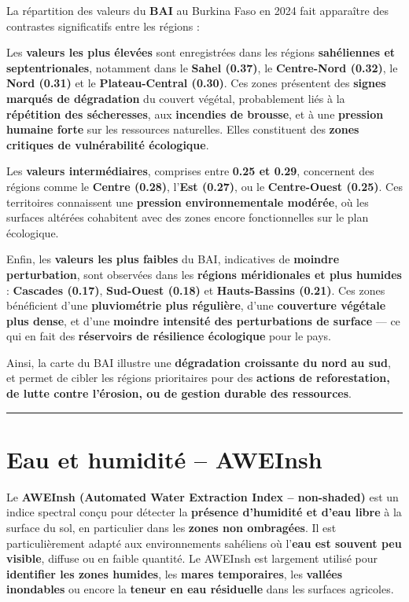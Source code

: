 \documentclass[
]{book}
\begin{document}
La répartition des valeurs du \textbf{BAI} au Burkina Faso en 2024 fait apparaître des contrastes significatifs entre les régions :

Les \textbf{valeurs les plus élevées} sont enregistrées dans les régions \textbf{sahéliennes et septentrionales}, notamment dans le \textbf{Sahel (0.37)}, le \textbf{Centre-Nord (0.32)}, le \textbf{Nord (0.31)} et le \textbf{Plateau-Central (0.30)}. Ces zones présentent des \textbf{signes marqués de dégradation} du couvert végétal, probablement liés à la \textbf{répétition des sécheresses}, aux \textbf{incendies de brousse}, et à une \textbf{pression humaine forte} sur les ressources naturelles. Elles constituent des \textbf{zones critiques de vulnérabilité écologique}.

Les \textbf{valeurs intermédiaires}, comprises entre \textbf{0.25 et 0.29}, concernent des régions comme le \textbf{Centre (0.28)}, l'\textbf{Est (0.27)}, ou le \textbf{Centre-Ouest (0.25)}. Ces territoires connaissent une \textbf{pression environnementale modérée}, où les surfaces altérées cohabitent avec des zones encore fonctionnelles sur le plan écologique.

Enfin, les \textbf{valeurs les plus faibles} du BAI, indicatives de \textbf{moindre perturbation}, sont observées dans les \textbf{régions méridionales et plus humides} : \textbf{Cascades (0.17)}, \textbf{Sud-Ouest (0.18)} et \textbf{Hauts-Bassins (0.21)}. Ces zones bénéficient d'une \textbf{pluviométrie plus régulière}, d'une \textbf{couverture végétale plus dense}, et d'une \textbf{moindre intensité des perturbations de surface} --- ce qui en fait des \textbf{réservoirs de résilience écologique} pour le pays.

Ainsi, la carte du BAI illustre une \textbf{dégradation croissante du nord au sud}, et permet de cibler les régions prioritaires pour des \textbf{actions de reforestation, de lutte contre l'érosion, ou de gestion durable des ressources}.

\begin{center}\rule{0.5\linewidth}{0.5pt}\end{center}

\section{Eau et humidité -- AWEInsh}\label{eau-et-humidituxe9-aweinsh}

Le \textbf{AWEInsh (Automated Water Extraction Index -- non-shaded)} est un indice spectral conçu pour détecter la \textbf{présence d'humidité et d'eau libre} à la surface du sol, en particulier dans les \textbf{zones non ombragées}. Il est particulièrement adapté aux environnements sahéliens où l'\textbf{eau est souvent peu visible}, diffuse ou en faible quantité. Le AWEInsh est largement utilisé pour \textbf{identifier les zones humides}, les \textbf{mares temporaires}, les \textbf{vallées inondables} ou encore la \textbf{teneur en eau résiduelle} dans les surfaces agricoles.
\end{document}
